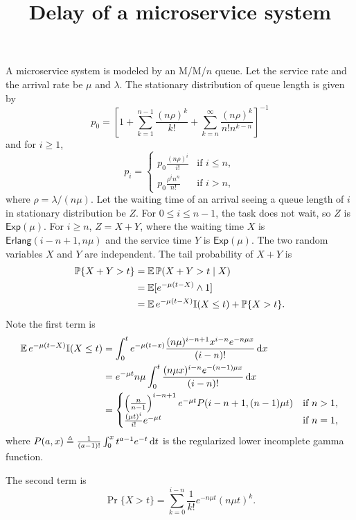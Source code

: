 \documentclass[12pt]{article}
\title{Delay of a microservice system}
\begin{document}
\maketitle

A microservice system is modeled by an M/M/$n$ queue.  Let the service
rate and the arrival rate be $\mu$ and $\lambda$.  The stationary
distribution of queue length is given by
\[p_0 = \left[1 + \sum_{k = 1}^{n - 1}\frac{(n\rho)^k}{k!} + \sum_{k =
      n}^\infty \frac{(n\rho)^k}{n!n^{k - n}}\right]^{-1}\]
and for $i \ge 1$,
\[p_i =
  \begin{cases}
    p_0\frac{(n\rho)^i}{i!} & \text{if }i \le n,\\
    p_0\frac{\rho^in^n}{n!} & \text{if }i > n,
  \end{cases}
\]
where $\rho = \lambda / (n\mu)$.  Let the waiting time of an arrival
seeing a queue length of $i$ in stationary distribution be $Z$.  For
$0\le i \le n - 1$, the task does not wait, so $Z$ is
$\mathsf{Exp}(\mu)$.  For $i\ge n$, $Z = X + Y$, where the waiting
time $X$ is $\mathsf{Erlang}(i - n + 1, n\mu)$ and the service time
$Y$ is $\mathsf{Exp}(\mu)$.  The two random variables $X$ and $Y$ are
independent.  The tail probability of $X + Y$ is
\begin{align*}
  \operatorname{\mathbb P}\{X + Y > t\} & = \operatorname{\mathbb E}\operatorname{\mathbb P}(X + Y > t\mid X)\\
  & = \operatorname{\mathbb E}[e^{-\mu(t - X)}\wedge 1]\\
  & = \operatorname{\mathbb E} e^{-\mu(t - X)}\mathbb{I}(X \le t) + \operatorname{\mathbb P}\{X > t\}.
\end{align*}
Note the first term is
\begin{align*}
  \operatorname{\mathbb E} e^{-\mu(t - X)}\mathbb{I}(X \le t) & = \int_0^te^{-\mu(t - x)}\frac{(n\mu)^{i - n + 1}x^{i - n}e^{-n\mu x}}{(i - n)!}\mathop{}\!\mathrm{d} x\\
  & = e^{-\mu t}n\mu\int_0^t\frac{(n\mu x)^{i - n}e^{-(n - 1)\mu x}}{(i - n)!}\mathop{}\!\mathrm{d} x\\
  & =
    \begin{cases}
      \left(\frac n{n - 1}\right)^{i - n + 1}e^{-\mu t}P(i - n + 1, (n - 1)\mu t) & \text{if }n > 1,\\
      \frac{(\mu t)^i}{i!}e^{-\mu t} & \text{if }n = 1,
    \end{cases}
\end{align*}
where $P(a, x)\triangleq\frac 1{(a - 1)!}\int_0^xt^{a - 1}e^{-t}\mathop{}\!\mathrm{d} t$ is
the regularized lower incomplete gamma function.

The second term is
\[\Pr\{X > t\} = \sum_{k = 0}^{i - n}\frac 1{k!}e^{-n\mu t}(n\mu t)^k.\]

% 
% 
\end{document}

